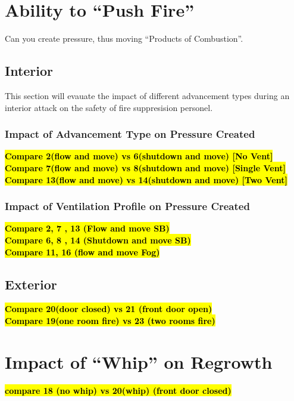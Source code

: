 \documentclass[12pt,oneside]{book}
\begin{document}
\section{Ability to ``Push Fire''}
Can you create pressure, thus moving ``Products of Combustion''.

\subsection{Interior}
This section will evauate the impact of different advancement types during an interior attack on the safety of fire suppresision personel.  

	\subsubsection{Impact of Advancement Type on Pressure Created}

	\bf{\hl{Compare 2(flow and move) vs 6(shutdown and move) [No Vent]}} \\
	\bf{\hl{Compare 7(flow and move) vs 8(shutdown and move) [Single Vent]}} \\
	\bf{\hl{Compare 13(flow and move) vs 14(shutdown and move) [Two Vent]}} \\

	\subsubsection{Impact of Ventilation Profile on Pressure Created}
	\bf{\hl{Compare 2, 7 , 13 (Flow and move SB)}} \\
	\bf{\hl{Compare 6, 8 , 14 (Shutdown and move SB)}} \\
	\bf{\hl{Compare 11, 16 (flow and move Fog)}} \\

\subsection{Exterior}
\bf{\hl{Compare 20(door closed) vs 21 (front door open)}} \\
\bf{\hl{Compare 19(one room fire) vs 23 (two rooms fire)}} \\

\section{Impact of ``Whip'' on Regrowth}
\bf{\hl{compare 18 (no whip) vs 20(whip) (front door closed)}} \\
\end{document}
